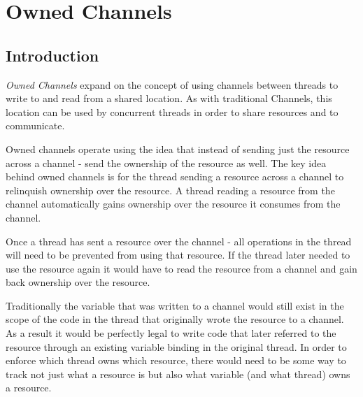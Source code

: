 \documentclass[onehalf,11pt]{beavtex}
\begin{document}








\chapter{Owned Channels}

\section{Introduction}

\textit{Owned Channels} expand on the concept of using channels between threads
to write to and read from a shared location.   As with traditional Channels,
this location can be used by concurrent threads in order to share resources and
to communicate.


Owned channels operate using the idea that instead of sending just the
resource across a channel - send the ownership of the resource as well.
The key idea behind owned channels is for the thread sending a
resource across a channel to relinquish ownership over the resource.
A thread reading a resource from the channel automatically gains ownership over
the resource it consumes from the channel.

Once a thread has sent a resource over the channel - all operations in the thread
will need to be prevented from using that resource.
If the thread later needed to use the resource again it would have to read the
resource from a channel and gain back ownership over the resource.

Traditionally the variable that was written to a channel would still exist in the
scope of the code in the thread that originally wrote the resource to a channel.
As a result it would be perfectly legal to write code that later referred to the
resource through an existing variable binding in the original thread.
In order to enforce which thread owns which resource, there would need to be
some way to track not just what a resource is but also what variable (and what
thread) owns a resource.
\end{document}
